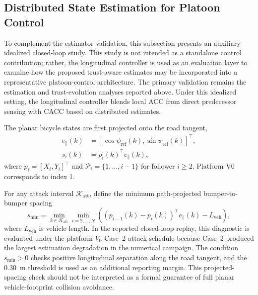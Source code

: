 \documentclass[letterpaper,journal]{IEEEtran}
\begin{document}
\subsection{Distributed State Estimation for Platoon Control}

To complement the estimator validation, this subsection presents an auxiliary idealized closed-loop study. This study is not intended as a standalone control contribution; rather, the longitudinal controller is used as an evaluation layer to examine how the proposed trust-aware estimates may be incorporated into a representative platoon-control architecture. The primary validation remains the estimation and trust-evolution analyses reported above. Under this idealized setting, the longitudinal controller blends local ACC from direct predecessor sensing with CACC based on distributed estimates.

The planar bicycle states are first projected onto the road tangent,
\begin{align}
    e_{\parallel}(k)&=[\cos\psi_{\mathrm{ref}}(k),\sin\psi_{\mathrm{ref}}(k)]^\top,\\
    s_i(k)&=p_i(k)^\top e_{\parallel}(k),
\end{align}
where $p_i=[X_i,Y_i]^\top$ and $\mathcal P_i=\{1,\ldots,i-1\}$ for follower $i\ge2$. Platform V0 corresponds to index 1.


For any attack interval \(\mathcal{K}_{\mathrm{att}}\), define the minimum path-projected bumper-to-bumper spacing
\begin{equation}
    s_{\min}=\min_{k\in\mathcal{K}_{\mathrm{att}}}\min_{i=2,\ldots,N}
    \left((p_{i-1}(k)-p_i(k))^\top e_{\parallel}(k)-L_{\mathrm{veh}}\right),
\end{equation}
where $L_{\mathrm{veh}}$ is vehicle length. In the reported closed-loop replay, this diagnostic is evaluated under the platform \(V_0\) Case~2 attack schedule because Case~2 produced the largest estimation degradation in the numerical campaign. The condition \(s_{\min}>0\) checks positive longitudinal separation along the road tangent, and the \(0.30\)~m threshold is used as an additional reporting margin. This projected-spacing check should not be interpreted as a formal guarantee of full planar vehicle-footprint collision avoidance.
\end{document}
